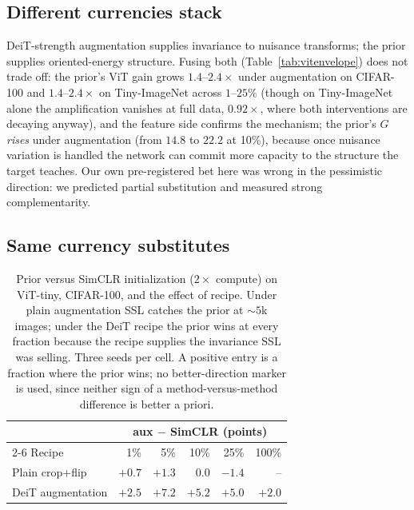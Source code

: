 \subsection{Different currencies stack}\label{sec:stack}
DeiT-strength augmentation supplies invariance to nuisance transforms;
the prior supplies oriented-energy structure. Fusing both
(Table~\ref{tab:vitenvelope}) does not trade off: the prior's ViT gain
grows $1.4$--$2.4\times$ under augmentation on CIFAR-100 and
$1.4$--$2.4\times$ on Tiny-ImageNet across $1$--$25\%$ (though on
Tiny-ImageNet alone the amplification vanishes at full data, $0.92\times$,
where both interventions are decaying anyway), and the feature side confirms the
mechanism; the prior's $G$ \emph{rises} under augmentation (from
$14.8$ to $22.2$ at 10\%), because once nuisance variation is handled the
network can commit more capacity to the structure the target teaches. Our
own pre-registered bet here was wrong in the pessimistic direction: we
predicted partial substitution and measured strong complementarity.

\subsection{Same currency substitutes}\label{sec:substitute}
\begin{table}[pos=htbp]
\caption{Prior versus SimCLR initialization ($2\times$ compute) on
ViT-tiny, CIFAR-100, and the effect of recipe. Under plain augmentation
SSL catches the prior at ${\sim}5$k images; under the DeiT recipe the
prior wins at every fraction because the recipe supplies the invariance
SSL was selling. Three seeds per cell. A positive entry is a fraction
where the prior wins; no better-direction marker is used, since neither
sign of a method-versus-method difference is better a priori.}
\label{tab:flip}
\centering\scriptsize
\setlength{\tabcolsep}{2.6pt}
\begin{tabular}{lrrrrr}
\toprule
 & \multicolumn{5}{c}{aux $-$ SimCLR (points)} \\
\cmidrule(l){2-6}
Recipe & 1\% & 5\% & 10\% & 25\% & 100\% \\
\midrule
Plain crop+flip & $+0.7$ & $+1.3$ & $0.0$ & $-1.4$ &-- \\
DeiT augmentation & $+2.5$ & $+7.2$ & $+5.2$ & $+5.0$ & $+2.0$ \\
\bottomrule
\end{tabular}
\end{table}

